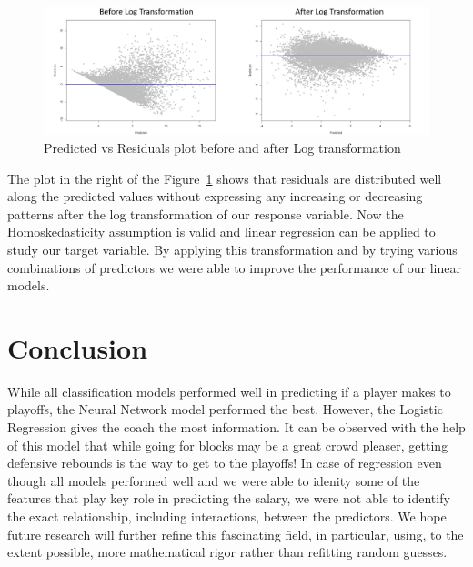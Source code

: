 \documentclass{article}
\begin{document}
\begin{figure}[H]
	\centering
        \includegraphics[width=\textwidth] {reg_fig2_fit_res.PNG}
	\caption{Predicted vs Residuals plot before and after Log transformation}
	\label{fig:reg_plot}
\end{figure}

The plot in the right of the Figure~\ref{fig:reg_plot} shows that residuals are distributed well along the predicted values without expressing any increasing or decreasing patterns after the 
log transformation of our response variable. Now the Homoskedasticity assumption is valid and linear regression can be applied to study our target variable.
By applying this transformation and by trying various combinations of predictors we were able to improve the performance of our linear models.

\section{Conclusion}
While all classification models performed well in predicting if a player makes to playoffs, the Neural Network model performed the best. However, the Logistic Regression gives the coach the most information. 
It can be observed with the help of this model that while going for blocks may be a great crowd pleaser, getting defensive rebounds is the way to get to the playoffs!
In case of regression even though all models performed well and we were able to idenity some of the features that play key role in predicting the salary, we were not able to identify the exact relationship, including interactions, between the predictors.
We hope future research will further refine this fascinating field, in particular, using, to the extent possible, more mathematical rigor rather than refitting random guesses.



\nocite{Povich}
\nocite{Vanhoucke}





\end{document}
